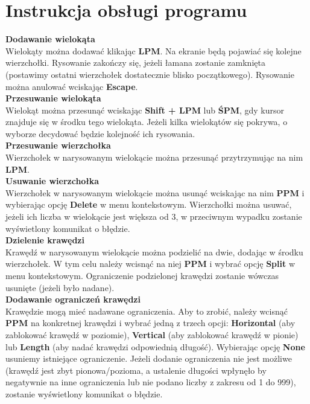 \documentclass[12pt]{article}
\begin{document}
\section{Instrukcja obsługi programu}
\textbf{Dodawanie wielokąta}\\Wielokąty można dodawać klikając \textbf{LPM}. Na ekranie będą pojawiać się kolejne wierzchołki. Rysowanie zakończy się, jeżeli łamana zostanie zamknięta (postawimy ostatni wierzchołek dostatecznie blisko początkowego). Rysowanie można anulować wciskając \textbf{Escape}.\\[\baselineskip]
\textbf{Przesuwanie wielokąta}\\Wielokąt można przesunąć wciskając \textbf{Shift + LPM} lub \textbf{ŚPM}, gdy kursor znajduje się w środku tego wielokąta. Jeżeli kilka wielokątów się pokrywa, o wyborze decydować będzie kolejność ich rysowania.\\[\baselineskip]
\textbf{Przesuwanie wierzchołka}\\Wierzchołek w narysowanym wielokącie można przesunąć przytrzymując na nim \textbf{LPM}.\\[\baselineskip]
\textbf{Usuwanie wierzchołka}\\Wierzchołek w narysowanym wielokącie można usunąć wciskając na nim \textbf{PPM} i wybierając opcję \textbf{Delete} w menu kontekstowym. Wierzchołki można usuwać, jeżeli ich liczba w wielokącie jest większa od 3, w przeciwnym wypadku zostanie wyświetlony komunikat o błędzie.\\[\baselineskip]
\textbf{Dzielenie krawędzi}\\Krawędź w narysowanym wielokącie można podzielić na dwie, dodając w środku wierzchołek. W tym celu należy wcisnąć na niej \textbf{PPM} i wybrać opcję \textbf{Split} w menu kontekstowym. Ograniczenie podzielonej krawędzi zostanie wówczas usunięte (jeżeli było nadane).\\[\baselineskip]
\textbf{Dodawanie ograniczeń krawędzi}\\Krawędzie mogą mieć nadawane ograniczenia. Aby to zrobić, należy wcisnąć \textbf{PPM} na konkretnej krawędzi i wybrać jedną z trzech opcji: \textbf{Horizontal} (aby zablokować krawędź w poziomie), \textbf{Vertical} (aby zablokować krawędź w pionie) lub \textbf{Length} (aby nadać krawędzi odpowiednią długość). Wybierając opcję \textbf{None} usuniemy istniejące ograniczenie. Jeżeli dodanie ograniczenia nie jest możliwe (krawędź jest zbyt pionowa/pozioma, a ustalenie długości wpłynęło by negatywnie na inne ograniczenia lub nie podano liczby z zakresu od 1 do 999), zostanie wyświetlony komunikat o błędzie.
\end{document}

